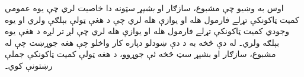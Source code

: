 \documentclass[12pt,a4paper,oneside]{report}
\gdef\pspart{#2}\gdef\pschapter{#3}\gdef\pssection{}%
\newcommand{\ollabel}[1]{\label{\pspart:\pschapter:\pssection:#1}}
\newtheorem{prop}[thm]{قضيه}
\theoremstyle{definition}
\newenvironment{explain}{}{}
\begin{document}
\label{olpseg:OLP-0130-B018:start}
\begin{explain}
اوس به وښيو چې مشبوع، سازګار او \emph{بشپړ} سټونه دا
خاصيت لري چې يوه عمومي کميت ټاکونکې تړلے فارمول
  هله او يوازې هله لري چې د هغې ټولې بېلګې ولري
  او يوه وجودي کميت ټاکونکې تړلے فارمول هله او
  يوازې هله لري چې لږ تر لږه د هغې يوه بېلګه ولري۔ له دې څخه به
د دې ښودلو دپاره کار واخلو چې هغه جوړښت چې له مشبوع،
سازګار او بشپړ سټ څخه ئې جوړوو، د هغه ټولې کميت ټاکونکې جملې
رښتونې کوي۔
\end{explain}
\label{olpseg:OLP-0130-B018:end}

\label{olpseg:OLP-0130-B019:start}
\label{olpseg:OLP-0130-B019:end}
\end{document}
